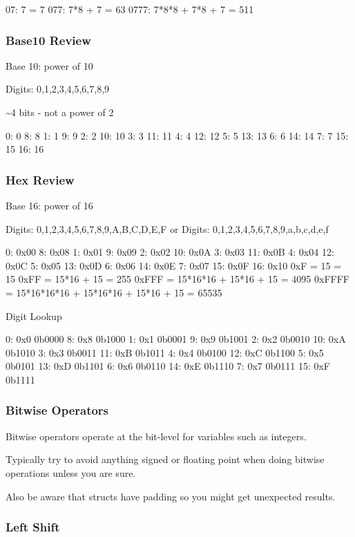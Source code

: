 \documentclass[11pt]{article}
\begin{document}
07:                 7 =   7
077:          7*8 + 7 =  63
0777: 7*8*8 + 7*8 + 7 = 511
\subsubsection{Base10 Review}
\label{sec:org3d08c04}
Base 10: power of 10

Digits: 0,1,2,3,4,5,6,7,8,9

\textasciitilde{}4 bits - not a power of 2

0:  0  8:  8
1:  1  9:  9   
2:  2 10: 10  
3:  3 11: 11  
4:  4 12: 12  
5:  5 13: 13 
6:  6 14: 14          
7:  7 15: 15 
      16: 16


\subsubsection{Hex Review}
\label{sec:orgd93a50b}

Base 16: power of 16

   Digits: 0,1,2,3,4,5,6,7,8,9,A,B,C,D,E,F
or Digits: 0,1,2,3,4,5,6,7,8,9,a,b,c,d,e,f

0:  0x00  8: 0x08
1:  0x01  9: 0x09   
2:  0x02 10: 0x0A  
3:  0x03 11: 0x0B   
4:  0x04 12: 0x0C  
5:  0x05 13: 0x0D  
6:  0x06 14: 0x0E           
7:  0x07 15: 0x0F  
         16: 0x10
0xF    =                                  15 =    15
0xFF   =                          15*16 + 15 =   255
0xFFF  =               15*16*16 + 15*16 + 15 =  4095
0xFFFF = 15*16*16*16 + 15*16*16 + 15*16 + 15 = 65535

Digit Lookup

0:  0x0 0b0000     8: 0x8 0b1000
1:  0x1 0b0001     9: 0x9 0b1001  
2:  0x2 0b0010    10: 0xA 0b1010 
3:  0x3 0b0011    11: 0xB 0b1011  
4:  0x4 0b0100    12: 0xC 0b1100 
5:  0x5 0b0101    13: 0xD 0b1101 
6:  0x6 0b0110    14: 0xE 0b1110          
7:  0x7 0b0111    15: 0xF 0b1111 


\subsubsection{Bitwise Operators}
\label{sec:org2dc733e}

Bitwise operators operate at the bit-level for variables such as integers.

Typically try to avoid anything signed or floating point when doing
bitwise operations unless you are sure.

Also be aware that structs have padding so you might get unexpected
results.

\subsubsection{Left Shift}
\label{sec:orgfcb94e8}
\end{document}
